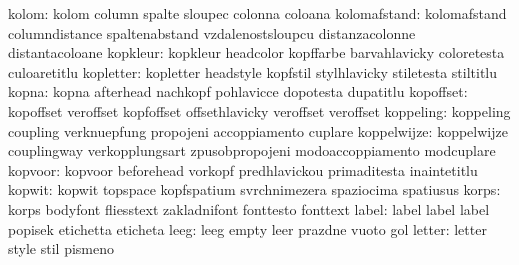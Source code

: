                     kolom: kolom                     column
                           spalte                    sloupec
                           colonna                   coloana
             kolomafstand: kolomafstand              columndistance
                           spaltenabstand            vzdalenostsloupcu
                           distanzacolonne           distantacoloane
                 kopkleur: kopkleur                  headcolor
                           kopffarbe                 barvahlavicky
                           coloretesta               culoaretitlu
                kopletter: kopletter                 headstyle
                           kopfstil                  stylhlavicky
                           stiletesta                stiltitlu
                    kopna: kopna                     afterhead
                           nachkopf                  pohlavicce
                           dopotesta                 dupatitlu
                kopoffset: kopoffset                 veroffset
                           kopfoffset                offsethlavicky
                           veroffset                 veroffset %
                koppeling: koppeling                 coupling
                           verknuepfung              propojeni
                           accoppiamento             cuplare
              koppelwijze: koppelwijze               couplingway
                           verkopplungsart           zpusobpropojeni
                           modoaccoppiamento         modcuplare
                  kopvoor: kopvoor                   beforehead
                           vorkopf                   predhlavickou
                           primaditesta              inaintetitlu
                   kopwit: kopwit                    topspace
                           kopfspatium               svrchnimezera
                           spaziocima                spatiusus
                    korps: korps                     bodyfont
                           fliesstext                zakladnifont
                           fonttesto                 fonttext
                    label: label                     label
                           label                     popisek
                           etichetta                 eticheta
                     leeg: leeg                      empty
                           leer                      prazdne
                           vuoto                     gol
                   letter: letter                    style
                           stil                      pismeno
